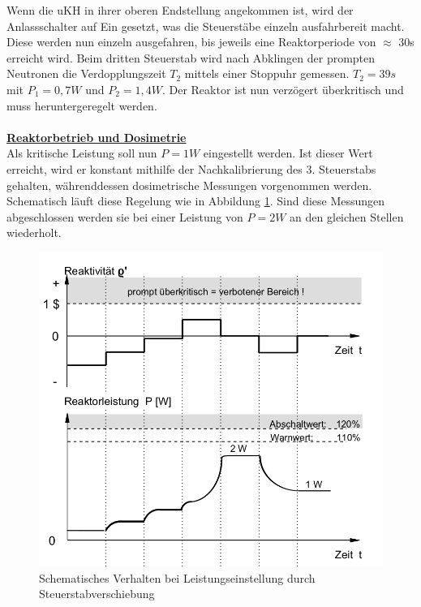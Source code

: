     Wenn die uKH in ihrer oberen Endstellung angekommen ist, wird der Anlassschalter auf Ein gesetzt, was die Steuerstäbe einzeln ausfahrbereit macht. Diese werden nun einzeln ausgefahren, bis jeweils eine Reaktorperiode von $\approx$ 30\unit{s} erreicht wird.
    Beim dritten Steuerstab wird nach Abklingen der prompten Neutronen die Verdopplungszeit $T_2$ mittels einer Stoppuhr gemessen. $T_2 = 39\unit{s}$ mit $P_1 = 0,7\unit{W}$ und $P_2 = 1,4\unit{W}$. Der Reaktor ist nun verzögert überkritisch und muss heruntergeregelt werden.\\ \ \\
    \underline{\textbf{Reaktorbetrieb und Dosimetrie}}\\
    Als kritische Leistung soll nun $P=1\unit{W}$ eingestellt werden. Ist dieser Wert erreicht, wird er konstant mithilfe der Nachkalibrierung des 3. Steuerstabs gehalten, währenddessen dosimetrische Messungen vorgenommen werden. Schematisch läuft diese Regelung wie in Abbildung \ref{skizze_leistung}.
     Sind diese Messungen abgeschlossen werden sie bei einer Leistung von $P = 2\unit{W}$ an den gleichen Stellen wiederholt.
   	\begin{center}
    	\begin{figure}
            \includegraphics[scale=0.3]{pic/verhalten.png}
       		 \caption{Schematisches Verhalten bei Leistungseinstellung durch Steuerstabverschiebung\cite{start}}
      	 	 \label{skizze_leistung}
   		 \end{figure}
    \end{center}

